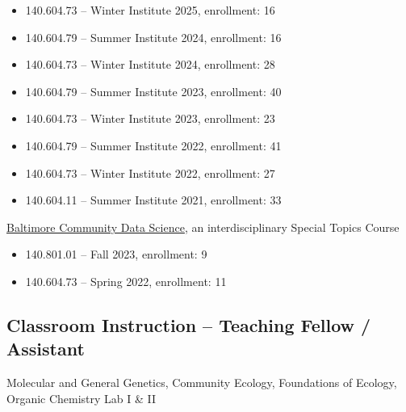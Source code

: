 \documentclass{cv}
\begin{document}
\begin{itemize}

\item 140.604.73 -- Winter Institute 2025, enrollment: 16

\item 140.604.79 -- Summer Institute 2024, enrollment: 16

\item 140.604.73 -- Winter Institute 2024, enrollment: 28

\item 140.604.79 -- Summer Institute 2023, enrollment: 40

\item 140.604.73 -- Winter Institute 2023, enrollment: 23

\item 140.604.79  -- Summer Institute 2022, enrollment: 41

\item 140.604.73 -- Winter Institute 2022, enrollment: 27

\item 140.604.11 -- Summer Institute 2021, enrollment: 33

\end{itemize}

\href{https://jhudatascience.org/Baltimore_Community_Course/index.html}{Baltimore Community Data Science}, an interdisciplinary Special Topics Course

\begin{itemize}

\item 140.801.01 -- Fall 2023, enrollment: 9

\item 140.604.73 -- Spring 2022, enrollment: 11

\end{itemize}

\subsection*{Classroom Instruction -- Teaching Fellow / Assistant}

Molecular and General Genetics, Community Ecology, Foundations of Ecology, Organic Chemistry Lab I \& II

%
%
%
%
%
%
%
%
\end{document}
